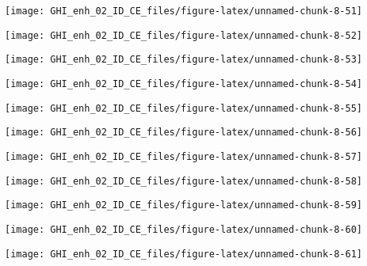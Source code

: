 \documentclass[
  10pt,
  a4paper,oneside]{article}
\begin{document}
\begin{center}\texttt{[image: GHI\_enh\_02\_ID\_CE\_files/figure-latex/unnamed-chunk-8-51]} \end{center}

\begin{center}\texttt{[image: GHI\_enh\_02\_ID\_CE\_files/figure-latex/unnamed-chunk-8-52]} \end{center}

\begin{center}\texttt{[image: GHI\_enh\_02\_ID\_CE\_files/figure-latex/unnamed-chunk-8-53]} \end{center}

\begin{center}\texttt{[image: GHI\_enh\_02\_ID\_CE\_files/figure-latex/unnamed-chunk-8-54]} \end{center}

\begin{center}\texttt{[image: GHI\_enh\_02\_ID\_CE\_files/figure-latex/unnamed-chunk-8-55]} \end{center}

\begin{center}\texttt{[image: GHI\_enh\_02\_ID\_CE\_files/figure-latex/unnamed-chunk-8-56]} \end{center}

\begin{center}\texttt{[image: GHI\_enh\_02\_ID\_CE\_files/figure-latex/unnamed-chunk-8-57]} \end{center}

\begin{center}\texttt{[image: GHI\_enh\_02\_ID\_CE\_files/figure-latex/unnamed-chunk-8-58]} \end{center}

\begin{center}\texttt{[image: GHI\_enh\_02\_ID\_CE\_files/figure-latex/unnamed-chunk-8-59]} \end{center}

\begin{center}\texttt{[image: GHI\_enh\_02\_ID\_CE\_files/figure-latex/unnamed-chunk-8-60]} \end{center}

\begin{center}\texttt{[image: GHI\_enh\_02\_ID\_CE\_files/figure-latex/unnamed-chunk-8-61]} \end{center}
\end{document}
